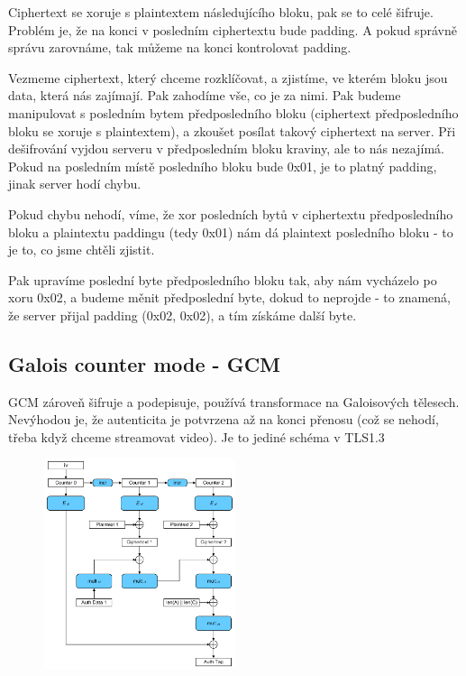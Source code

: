 Ciphertext se xoruje s plaintextem následujícího bloku, pak se to celé šifruje. Problém je, že na konci v posledním ciphertextu bude padding. A pokud správně správu zarovnáme, tak můžeme na konci kontrolovat padding.

Vezmeme ciphertext, který chceme rozklíčovat, a zjistíme, ve kterém bloku jsou data, která nás zajímají. Pak zahodíme vše, co je za nimi. Pak budeme manipulovat s posledním bytem předposledního bloku (ciphertext předposledního bloku se xoruje s plaintextem), a zkoušet posílat takový ciphertext na server. Při dešifrování vyjdou serveru v předposledním bloku kraviny, ale to nás nezajímá. Pokud na posledním místě posledního bloku bude 0x01, je to platný padding, jinak server hodí chybu.

Pokud chybu nehodí, víme, že xor posledních bytů v ciphertextu předposledního bloku a plaintextu paddingu (tedy 0x01) nám dá plaintext posledního bloku - to je to, co jsme chtěli zjistit.

Pak upravíme poslední byte předposledního bloku tak, aby nám vycházelo po xoru 0x02, a budeme měnit předposlední byte, dokud to neprojde - to znamená, že server přijal padding (0x02, 0x02), a tím získáme další byte.


\subsection{Galois counter mode - GCM}

GCM zároveň šifruje a podepisuje, používá transformace na Galoisových tělesech. Nevýhodou je, že autenticita je potvrzena až na konci přenosu (což se nehodí, třeba když chceme streamovat video). Je to jediné schéma v TLS1.3

\begin{figure}[ht!]
\centering
\includegraphics[width=0.5\textwidth]{KBE/img/gcm.png}
\end{figure}






